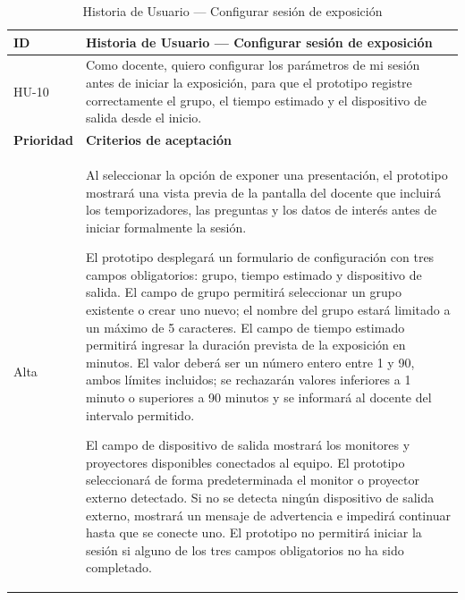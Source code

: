 \documentclass[11pt]{article}
\begin{document}
\begin{table}[H]
    \centering
    \renewcommand{\arraystretch}{1.2}
    \begin{tabular}{|p{2.5cm}|p{11cm}|}
        \hline
        \textbf{ID} & \textbf{Historia de Usuario --- Configurar sesión de exposición} \\
        \hline
        HU-10 & Como docente, quiero configurar los parámetros de mi sesión antes de iniciar la exposición, para que el prototipo registre correctamente el grupo, el tiempo estimado y el dispositivo de salida desde el inicio. \\
        \hline
        \textbf{Prioridad} & \textbf{Criterios de aceptación} \\
        \hline
        Alta & Al seleccionar la opción de exponer una presentación, el prototipo mostrará una vista previa de la pantalla del docente que incluirá los temporizadores, las preguntas y los datos de interés antes de iniciar formalmente la sesión.

        El prototipo desplegará un formulario de configuración con tres campos obligatorios: grupo, tiempo estimado y dispositivo de salida. El campo de grupo permitirá seleccionar un grupo existente o crear uno nuevo; el nombre del grupo estará limitado a un máximo de 5 caracteres. El campo de tiempo estimado permitirá ingresar la duración prevista de la exposición en minutos. El valor deberá ser un número entero entre 1 y 90, ambos límites incluidos; se rechazarán valores inferiores a 1 minuto o superiores a 90 minutos y se informará al docente del intervalo permitido.

        El campo de dispositivo de salida mostrará los monitores y proyectores disponibles conectados al equipo. El prototipo seleccionará de forma predeterminada el monitor o proyector externo detectado. Si no se detecta ningún dispositivo de salida externo, mostrará un mensaje de advertencia e impedirá continuar hasta que se conecte uno. El prototipo no permitirá iniciar la sesión si alguno de los tres campos obligatorios no ha sido completado. \\
        \hline
    \end{tabular}
    \caption{Historia de Usuario --- Configurar sesión de exposición}
    \label{tab:hu-configurar-sesion-exposicion}
\end{table}
\end{document}
